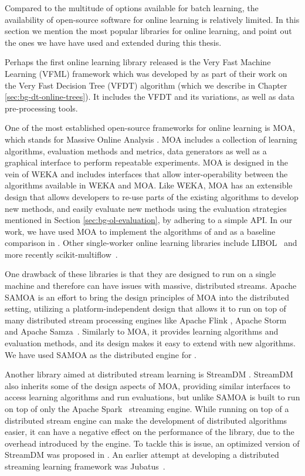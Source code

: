 Compared to the multitude of options available for batch learning, the availability
of open-source software for online learning is relatively limited. In this section we
mention the most popular libraries for online learning, and point out the ones we have have used
and extended during this thesis.

Perhaps the first online learning library released is the Very Fast Machine Learning (VFML) framework which was developed by \citet{vfdt} as part of their work on the Very Fast Decision Tree (VFDT) algorithm (which we describe in Chapter \ref{sec:bg-dt-online-trees}).
It includes the VFDT and its variations, as well as data pre-processing tools.

One of the most established open-source frameworks for online learning is MOA, which stands
for Massive Online Analysis \cite{bifet2010moa}. MOA includes a collection of
learning algorithms, evaluation methods and metrics, data generators as well as
a graphical interface to perform repeatable experiments. MOA is designed in the
vein of WEKA \cite{weka} and includes interfaces that allow inter-operability
between the algorithms available in WEKA and MOA. Like WEKA, MOA has an extensible
design that allows developers to re-use parts of the existing algorithms to develop
new methods, and easily evaluate new methods using the evaluation strategies mentioned
in Section \ref{sec:bg-ol-evaluation}, by adhering to a simple API. In our work,
we have used MOA to implement the algorithms of \uncertaintrees and as a baseline comparison
in \boostvht. Other single-worker online learning libraries
include LIBOL~\cite{libol} and more recently scikit-multiflow~\cite{sk-multiflow}.

One drawback of these libraries is that they are designed to run on a single machine and therefore
can have issues with massive, distributed streams. Apache SAMOA \cite{samoa} is an effort
to bring the design principles of MOA into the distributed setting, utilizing a platform-independent
design that allows it to run on top of many distributed stream processing engines like
Apache Flink \cite{flink}, Apache Storm~\cite{storm} and Apache Samza~\cite{samza}.
Similarly to MOA, it provides learning algorithms and evaluation methods, and its
design makes it easy to extend with new algorithms.
We have used SAMOA as the distributed engine for \boostvht.

Another library aimed at distributed stream learning is StreamDM \cite{streamdm}.
StreamDM also inherits some of the design aspects of MOA, providing similar interfaces
to access learning algorithms and run evaluations, but unlike SAMOA
is built to run on top of only the Apache Spark~\cite{spark} streaming engine.
While running on top of a distributed stream engine can make the development
of distributed algorithms easier, it can have a negative effect on the
performance of the library, due to the overhead introduced by the
engine. To tackle this is issue, an optimized version of StreamDM
was proposed in \cite{streamdmPP}. An earlier attempt at developing
a distributed streaming learning framework was Jubatus~\cite{jubatus}.

